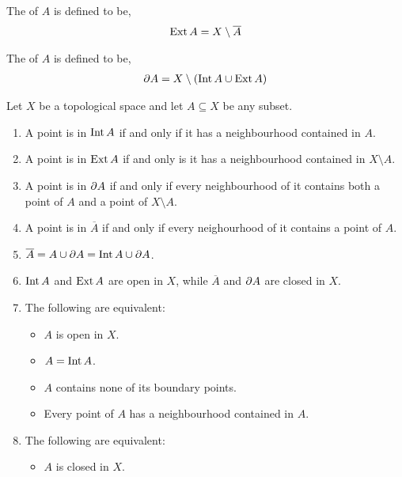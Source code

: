 \begin{definition}[Exterior]
	The  of $ A $ is defined to be,
	\begin{align*}
		\operatorname{Ext}{A} = X \setminus \overline{A}
	\end{align*}
\end{definition}

\begin{definition}[Boundary]
	The  of $ A $ is defined to be,
	\begin{align*}
		\operatorname{\partial\!}{A} = X \setminus ( \operatorname{Int}{A} \cup \operatorname{Ext}{A} )
	\end{align*}
\end{definition}

\begin{proposition}
	Let $ X $ be a topological space and let $ A \subseteq X $ be any subset.
	\begin{enumerate}
		\item A point is in $ \operatorname{Int}{A} $ if and only if it has a neighbourhood contained in $ A $.
		\item A point is in $ \operatorname{Ext}{A} $ if and only is it has a neighbourhood contained in $ X \setminus A $.
		\item A point is in $ \operatorname{\partial\!}{A} $ if and only if every neighbourhood of it contains both a point of $ A $ and a point of $ X \setminus A $.
		\item A point is in $ \overline{A} $ if and only if every neighourhood of it contains a point of $ A $.
		\item $ \overline{A} = A \cup \operatorname{\partial\!}{A} = \operatorname{Int}{A} \cup \operatorname{\partial\!}{A} $.
		\item $ \operatorname{Int}{A} $ and $ \operatorname{Ext}{A} $ are open in $ X $, while $ \overline{A} $ and $ \operatorname{\partial\!}{A} $ are closed in $ X $.
		\item The following are equivalent:
		      \begin{itemize}
			      \item $ A $ is open in $ X $.
			      \item $ A = \operatorname{Int}{A} $.
			      \item $ A $ contains none of its boundary points.
			      \item Every point of $ A $ has a neighbourhood contained in $ A $.
		      \end{itemize}
		\item The following are equivalent:
		      \begin{itemize}
			      \item $ A $ is closed in $ X $.

\end{itemize}
\end{enumerate}
\end{proposition}
